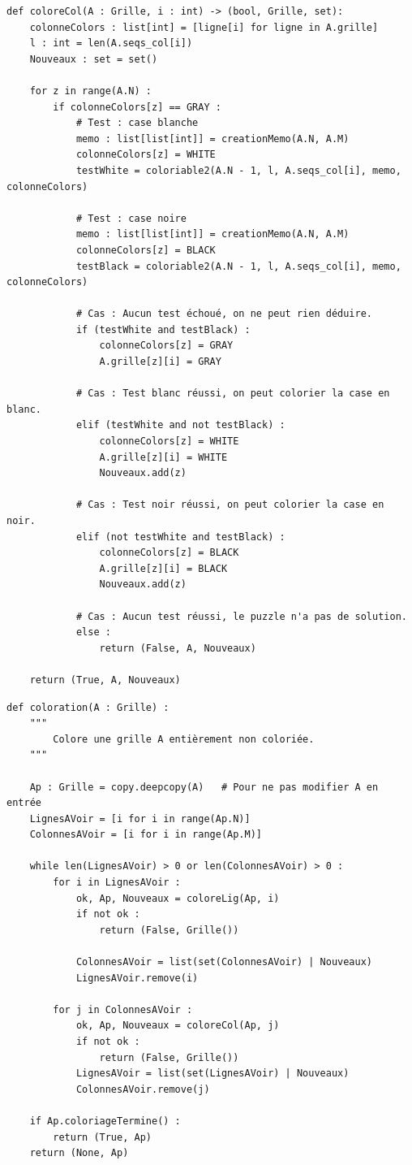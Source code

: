 \documentclass[a4paper,12pt]{article}
\begin{document}
\begin{lstlisting}
def coloreCol(A : Grille, i : int) -> (bool, Grille, set):
    colonneColors : list[int] = [ligne[i] for ligne in A.grille]
    l : int = len(A.seqs_col[i])
    Nouveaux : set = set()
    
    for z in range(A.N) :
        if colonneColors[z] == GRAY :
            # Test : case blanche
            memo : list[list[int]] = creationMemo(A.N, A.M)
            colonneColors[z] = WHITE
            testWhite = coloriable2(A.N - 1, l, A.seqs_col[i], memo, colonneColors)
            
            # Test : case noire
            memo : list[list[int]] = creationMemo(A.N, A.M)
            colonneColors[z] = BLACK
            testBlack = coloriable2(A.N - 1, l, A.seqs_col[i], memo, colonneColors)
            
            # Cas : Aucun test échoué, on ne peut rien déduire.
            if (testWhite and testBlack) :
                colonneColors[z] = GRAY
                A.grille[z][i] = GRAY
            
            # Cas : Test blanc réussi, on peut colorier la case en blanc.
            elif (testWhite and not testBlack) :
                colonneColors[z] = WHITE
                A.grille[z][i] = WHITE
                Nouveaux.add(z)
                
            # Cas : Test noir réussi, on peut colorier la case en noir.
            elif (not testWhite and testBlack) :
                colonneColors[z] = BLACK
                A.grille[z][i] = BLACK
                Nouveaux.add(z)
                
            # Cas : Aucun test réussi, le puzzle n'a pas de solution.
            else :
                return (False, A, Nouveaux)
    
    return (True, A, Nouveaux)
\end{lstlisting}

\newpage

\begin{lstlisting}
def coloration(A : Grille) :
    """
        Colore une grille A entièrement non coloriée.
    """
    
    Ap : Grille = copy.deepcopy(A)   # Pour ne pas modifier A en entrée
    LignesAVoir = [i for i in range(Ap.N)]
    ColonnesAVoir = [i for i in range(Ap.M)]
    
    while len(LignesAVoir) > 0 or len(ColonnesAVoir) > 0 :
        for i in LignesAVoir :
            ok, Ap, Nouveaux = coloreLig(Ap, i)
            if not ok :
                return (False, Grille())
            
            ColonnesAVoir = list(set(ColonnesAVoir) | Nouveaux)
            LignesAVoir.remove(i)
         
        for j in ColonnesAVoir :
            ok, Ap, Nouveaux = coloreCol(Ap, j)
            if not ok :
                return (False, Grille())
            LignesAVoir = list(set(LignesAVoir) | Nouveaux)
            ColonnesAVoir.remove(j)
        
    if Ap.coloriageTermine() :
        return (True, Ap)
    return (None, Ap)
\end{lstlisting}
\end{document}
